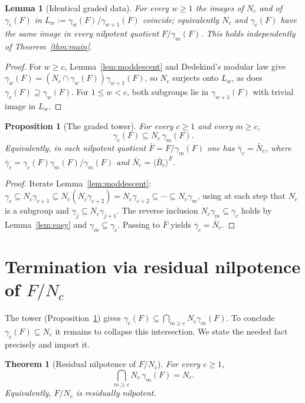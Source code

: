 \documentclass{amsart}
\newtheorem{theorem}{Theorem}
\newtheorem{lemma}{Lemma}
\newtheorem{proposition}{Proposition}
\theoremstyle{definition}
\theoremstyle{remark}
\begin{document}
\begin{lemma}[Identical graded data]\label{lem:gradedNc}
For every $w\ge1$ the images of $N_c$ and of $\gamma_c(F)$ in
$L_w:=\gamma_w(F)/\gamma_{w+1}(F)$ coincide; equivalently $N_c$ and $\gamma_c(F)$
have the same image in every nilpotent quotient $F/\gamma_m(F)$. This holds
independently of Theorem~\ref{thm:main}.
\end{lemma}
\begin{proof}
For $w\ge c$, Lemma~\ref{lem:moddescent} and Dedekind's modular law give
$\gamma_w(F)=(N_c\cap\gamma_w(F))\gamma_{w+1}(F)$, so $N_c$ surjects onto $L_w$, as
does $\gamma_c(F)\supseteq\gamma_w(F)$. For $1\le w<c$, both subgroups lie in
$\gamma_{w+1}(F)$ with trivial image in $L_w$.
\end{proof}

\begin{proposition}[The graded tower]\label{prop:finiteS}
For every $c\ge1$ and every $m\ge c$,
\[
\gamma_c(F)\subseteq N_c\,\gamma_m(F).
\]
Equivalently, in each nilpotent quotient $\bar F=F/\gamma_m(F)$ one has
$\bar\gamma_c=\bar N_c$, where $\bar\gamma_c=\gamma_c(F)\gamma_m(F)/\gamma_m(F)$ and
$\bar N_c=\langle\bar B_c\rangle^{\bar F}$.
\end{proposition}
\begin{proof}
Iterate Lemma~\ref{lem:moddescent}:
$\gamma_c\subseteq N_c\gamma_{c+1}\subseteq N_c(N_c\gamma_{c+2})=N_c\gamma_{c+2}
\subseteq\cdots\subseteq N_c\gamma_m$, using at each step that $N_c$ is a subgroup
and $\gamma_{j}\subseteq N_c\gamma_{j+1}$. The reverse inclusion
$N_c\gamma_m\subseteq\gamma_c$ holds by Lemma~\ref{lem:easy} and
$\gamma_m\subseteq\gamma_c$. Passing to $\bar F$ yields $\bar\gamma_c=\bar N_c$.
\end{proof}

\section{Termination via residual nilpotence of $F/N_c$}\label{sec:close}

The tower (Proposition~\ref{prop:finiteS}) gives
$\gamma_c(F)\subseteq\bigcap_{m\ge c}N_c\gamma_m(F)$. To conclude
$\gamma_c(F)\subseteq N_c$ it remains to collapse this intersection. We state the
needed fact precisely and import it.

\begin{theorem}[Residual nilpotence of $F/N_c$]\label{thm:resnilp}
For every $c\ge1$,
\[
\bigcap_{m\ge c} N_c\,\gamma_m(F)=N_c .
\]
Equivalently, $F/N_c$ is residually nilpotent.
\end{theorem}
\end{document}
